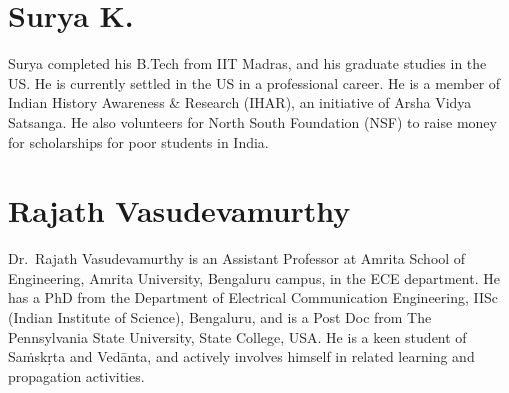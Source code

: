 \section*{Surya K.}

Surya completed his B.Tech from IIT Madras, and his graduate studies in the US. He is currently settled in the US in a professional career. He is a member of Indian History Awareness \& Research (IHAR), an initiative of Arsha Vidya Satsanga. He also volunteers for North South Foundation (NSF) to raise money for scholarships for poor students in India. 

\section*{Rajath Vasudevamurthy}

Dr.~Rajath Vasudevamurthy is an Assistant Professor at Amrita School of Engineering, Amrita University, Bengaluru campus, in the ECE department. He has a PhD from the Department of Electrical Communication Engineering, IISc (Indian Institute of Science), Bengaluru, and is a Post Doc from The Pennsylvania State University, State College, USA. He is a keen student of Saṁskṛta and Vedānta, and actively involves himself in related learning and propagation activities.

